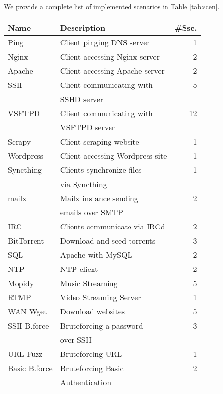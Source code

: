 




We provide a complete list of implemented scenarios in Table \ref{tab:scen}.

\begin{table}
\begin{tabular}{l|l|r}
 \hline
 Name & Description & \#Ssc. \\
 \hline
 Ping & Client pinging DNS server & 1 \\
 Nginx & Client accessing Nginx server & 2\\
 Apache & Client accessing Apache server & 2\\
 SSH & Client communicating with & 5\\
 &SSHD server&\\
 VSFTPD & Client communicating with & 12\\
 &VSFTPD server&\\
 Scrapy & Client scraping website & 1 \\
 Wordpress & Client accessing Wordpress site & 1\\
 Syncthing& Clients synchronize files & 1\\
 &via Syncthing&\\
 mailx& Mailx instance sending & 2\\
 &emails over SMTP &\\
 IRC & Clients communicate via IRCd& 2\\
 BitTorrent & Download and seed torrents & 3 \\
 SQL & Apache with MySQL & 2\\
 NTP & NTP client & 2\\
 Mopidy & Music Streaming & 5\\
 RTMP & Video Streaming Server & 1\\
 WAN Wget & Download websites & 5 \\
 \hline
 SSH B.force & Bruteforcing a password & 3\\
 &over SSH&\\
 URL Fuzz & Bruteforcing URL & 1\\
 Basic B.force & Bruteforcing Basic & 2\\
 &Authentication&\\

\end{tabular}
\end{table}
